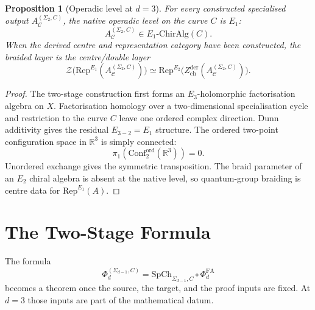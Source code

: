 \documentclass[11pt]{article}
\newtheorem{proposition}[theorem]{Proposition}
\begin{document}
\begin{proposition}[Operadic level at $d=3$]
\label{prop:e1-level}
For every constructed specialised output
$A_{\mathcal C}^{(\Sigma_2,C)}$, the native operadic level on the curve
$C$ is $E_1$:
\[
  A_{\mathcal C}^{(\Sigma_2,C)}\in E_1\text{-}\mathrm{ChirAlg}(C).
\]
When the derived centre and representation category have been
constructed, the braided layer is the centre/double layer
\[
  \mathcal Z\bigl(\mathrm{Rep}^{E_1}(A_{\mathcal C}^{(\Sigma_2,C)})\bigr)
  \simeq
  \mathrm{Rep}^{E_2}\bigl(Z^{\mathrm{der}}_{\mathrm{ch}}
  (A_{\mathcal C}^{(\Sigma_2,C)})\bigr).
\]
\end{proposition}

\begin{proof}
The two-stage construction first forms an $E_3$-holomorphic
factorisation algebra on $X$.  Factorisation homology over a
two-dimensional specialisation cycle and restriction to the curve $C$
leave one ordered complex direction.  Dunn additivity gives the
residual $E_{3-2}=E_1$ structure.  The ordered two-point configuration
space in $\mathbb R^3$ is simply connected:
\[
  \pi_1(\mathrm{Conf}^{\mathrm{ord}}_2(\mathbb R^3))=0.
\]
Unordered exchange gives the symmetric transposition.  The braid
parameter of an $E_2$ chiral algebra is absent at the native level, so
quantum-group braiding is centre data for $\mathrm{Rep}^{E_1}(A)$.
\end{proof}

\section{The Two-Stage Formula}
\label{sec:two-stage}

The formula
\[
  \Phi^{(\Sigma_{d-1},C)}_d
  =
  \mathrm{SpCh}_{\Sigma_{d-1},C}\circ \Phi^{\mathrm{FA}}_d
\]
becomes a theorem once the source, the target, and the proof inputs are
fixed.  At $d=3$ those inputs are part of the mathematical datum.
\end{document}
